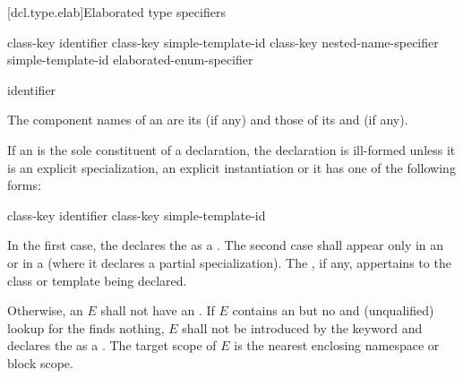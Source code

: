 [dcl.type.elab]{Elaborated type specifiers}%
%
%

\begin{bnf}
\br
    class-key   identifier\br
    class-key simple-template-id\br
    class-key nested-name-specifier  simple-template-id\br
    elaborated-enum-specifier
\end{bnf}

\begin{bnf}
\br
      identifier
\end{bnf}

\pnum
{}%
The component names of an  are
its  (if any) and
those of its  and
 (if any).

\pnum
{}%
%
If an  is the sole constituent of a
declaration, the declaration is ill-formed unless it is an explicit
specialization, an explicit
instantiation or it has one of the following
forms:
\begin{ncsimplebnf}
class-key  identifier \terminal{;}\br
class-key  simple-template-id \terminal{;}
\end{ncsimplebnf}

In the first case,
the  declares
the  as a .
The second case shall appear only
in an  or
in a 
(where it declares a partial specialization).
The , if any, appertains
to the class or template being declared.

\pnum
Otherwise, an  $E$ shall not have
an .
If $E$ contains an 
but no  and
(unqualified) lookup for the  finds nothing,
$E$ shall not be introduced by the  keyword and
declares the  as a .
The target scope of $E$ is the nearest enclosing namespace or block scope.

